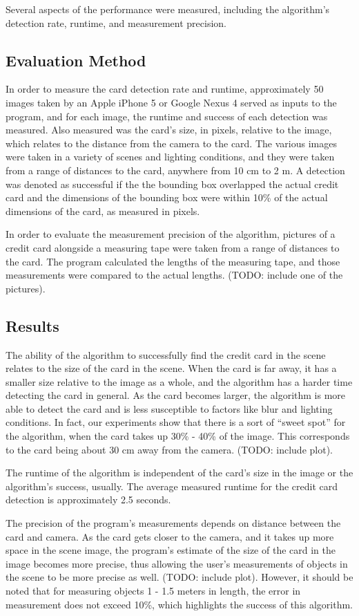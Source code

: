 \documentclass[10pt,twocolumn,letterpaper]{article}
\begin{document}
Several aspects of the performance were measured, including the algorithm’s detection rate, runtime, and measurement precision.

\subsection{Evaluation Method}
	In order to measure the card detection rate and runtime, approximately 50 images taken by an Apple iPhone 5 or Google Nexus 4 served as inputs to the program, and for each image, the runtime and success of each detection was measured. Also measured was the card’s size, in pixels, relative to the image, which relates to the distance from the camera to the card. The various images were taken in a variety of scenes and lighting conditions, and they were taken from a range of distances to the card, anywhere from 10 cm to 2 m. A detection was denoted as successful if the the bounding box overlapped the actual credit card and the dimensions of the bounding box were within 10\% of the actual dimensions of the card, as measured in pixels. 

	In order to evaluate the measurement precision of the algorithm, pictures of a credit card alongside a measuring tape were taken from a range of distances to the card. The program calculated the lengths of the measuring tape, and those measurements were compared to the actual lengths. (TODO: include one of the pictures).
\subsection{Results}
	The ability of the algorithm to successfully find the credit card in the scene relates to the size of the card in the scene. When the card is far away, it has a smaller size relative to the image as a whole, and the algorithm has a harder time detecting the card in general. As the card becomes larger, the algorithm is more able to detect the card and is less susceptible to factors like blur and lighting conditions. In fact, our experiments show that there is a sort of 
“sweet spot” for the algorithm, when the card takes up 30\% - 40\% of the image. This corresponds to the card being about 30 cm away from the camera. (TODO: include plot).

	The runtime of the algorithm is independent of the card’s size in the image or the algorithm’s success, usually. The average measured runtime for the credit card detection is approximately 2.5 seconds. 

	The precision of the program’s measurements depends on distance between the card and camera. As the card gets closer to the camera, and it takes up more space in the scene image, the program’s estimate of the size of the card in the image becomes more precise, thus allowing the user’s measurements of objects in the scene to be more precise as well. (TODO: include plot). However, it should be noted that for measuring objects 1 - 1.5 meters in length, the error in measurement does not exceed 10\%, which highlights the success of this algorithm. 
	
\end{document}

